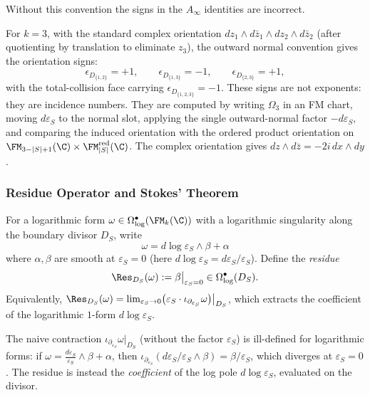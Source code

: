 Without this convention the signs in the $A_\infty$ identities are incorrect.

\begin{example}[Orientation signs for $k=3$]
For $k=3$, with the standard complex orientation $dz_1 \wedge d\bar{z}_1 \wedge dz_2 \wedge d\bar{z}_2$ (after quotienting by translation to eliminate $z_3$), the outward normal convention gives the orientation signs:
\[
\epsilon_{D_{\{1,2\}}} = +1, \qquad
\epsilon_{D_{\{1,3\}}} = -1, \qquad
\epsilon_{D_{\{2,3\}}} = +1,
\]
with the total-collision face carrying
\(\epsilon_{D_{\{1,2,3\}}}=-1\). These signs are not exponents:
they are incidence numbers.  They are computed by writing
\(\Omega_3\) in an FM chart, moving \(d\varepsilon_S\) to the
normal slot, applying the single outward-normal factor
\(-d\varepsilon_S\), and comparing the induced orientation with
the ordered product orientation on
\(\FM_{3-|S|+1}(\C)\times \FM_{|S|}^{\mathrm{red}}(\C)\).
The complex orientation gives \(dz\wedge d\bar z=-2i\,dx\wedge dy\).
\end{example}

\subsubsection{Residue Operator and Stokes' Theorem}

\begin{definition}
\label{def:residue_divisor}
For a logarithmic form $\omega \in \Omega^{\bullet}_{\log}(\FM_k(\C))$ with a logarithmic singularity along the boundary divisor $D_S$, write
\[
\omega = d\log\varepsilon_S \wedge \beta + \alpha
\]
where $\alpha, \beta$ are smooth at $\varepsilon_S = 0$ (here $d\log\varepsilon_S = d\varepsilon_S / \varepsilon_S$). Define the \emph{residue}
\[
\Res_{D_S}(\omega) := \beta\big|_{\varepsilon_S = 0} \in \Omega^{\bullet}_{\log}(D_S).
\]
Equivalently, $\Res_{D_S}(\omega) = \lim_{\varepsilon_S \to 0} \bigl(\varepsilon_S \cdot \iota_{\partial_{\varepsilon_S}} \omega\bigr)\big|_{D_S}$, which extracts the coefficient of the logarithmic $1$-form $d\log\varepsilon_S$.
\end{definition}

\begin{remark}
The naive contraction $\iota_{\partial_{\varepsilon_S}} \omega|_{D_S}$ (without the factor $\varepsilon_S$) is ill-defined for logarithmic forms: if $\omega = \frac{d\varepsilon_S}{\varepsilon_S} \wedge \beta + \alpha$, then $\iota_{\partial_{\varepsilon_S}}(d\varepsilon_S/\varepsilon_S \wedge \beta) = \beta/\varepsilon_S$, which diverges at $\varepsilon_S = 0$. The residue is instead the \emph{coefficient} of the log pole $d\log\varepsilon_S$, evaluated on the divisor.
\end{remark}

